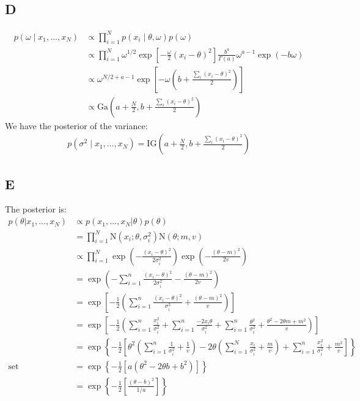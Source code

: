 \documentclass{article}
\begin{document}
\subsection*{D}
\begin{align*}
p(\omega \mid x_1, \ldots, x_N) &\propto \prod_{i=1}^N p(x_i \mid \theta, \omega) p(\omega)\\
&\propto \prod_{i=1}^N \omega^{1/2} \exp \left[- \frac{\omega}{2}(x_i-\theta)^2 \right] \frac{b^a}{\Gamma(a)}\omega^{a-1}\exp(-b\omega)\\
&\propto \omega^{N/2 + a - 1} \exp\left[ -\omega \left( b + \frac{\sum_i(x_i-\theta)^2}{2} \right) \right]\\
&\propto \mbox{Ga}\left(a+\frac{N}{2}, b + \frac{\sum_i(x_i-\theta)^2}{2} \right)
\end{align*}
We have the posterior of the variance:
\begin{align*}
p(\sigma^2\mid x_1, \ldots, x_N) = \mbox{IG}\left(a+\frac{N}{2}, b + \frac{\sum_i(x_i-\theta)^2}{2} \right)
\end{align*}

\subsection*{E}
The posterior is:
\begin{align*}
p(\theta| x_1, \ldots, x_N) &\propto p(x_1, \ldots, x_N | \theta) p(\theta)\\
&=\prod_{i=1}^N \mbox{N}(x_i; \theta, \sigma_i^2) \mbox{N}(\theta; m, v)\\
&\propto \prod_{i=1}^N \exp\left( -\frac{(x_i-\theta)^2}{2\sigma_i^2} \right) \exp\left( -\frac{(\theta - m)^2}{2v} \right)\\
&= \exp\left( -\sum_{i=1}^n\frac{(x_i-\theta)^2}{2\sigma_i^2}  -\frac{(\theta - m)^2}{2v} \right)\\
&= \exp\left[ -\frac{1}{2}\left( \sum_{i=1}^n\frac{(x_i-\theta)^2}{\sigma_i^2} + \frac{(\theta - m)^2}{v}\right) \right]\\
&= \exp\left[ -\frac{1}{2}\left( \sum_{i=1}^n\frac{x_i^2}{\sigma_i^2} + \sum_{i=1}^n\frac{-2x_i\theta}{\sigma_i^2} + \sum_{i=1}^n\frac{\theta^2}{\sigma_i^2}  + \frac{\theta^2 - 2\theta m + m^2}{v} \right)\right]\\
&=\exp\left\lbrace -\frac{1}{2}\left[  \theta^2\left( \sum_{i=1}^n\frac{1}{\sigma_i^2} + \frac{1}{v} \right) -2 \theta\left(\sum_{i=1}^N\frac{x_i}{\sigma_i^2} + \frac{m}{v}\right) + \sum_{i=1}^n\frac{x_i^2}{\sigma_i^2} + \frac{m^2}{v} \right] \right\rbrace\\
\text{set }  &= \exp\left\lbrace -\frac{1}{2}\left[a(\theta^2 -2\theta b + b^2) \right] \right\rbrace\\
&= \exp\left\lbrace -\frac{1}{2}\left[\frac{(\theta-b)^2}{1/a} \right] \right\rbrace\\
\end{align*}
\end{document}

